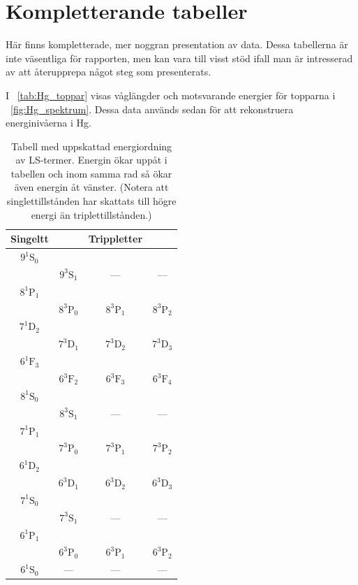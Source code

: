 \documentclass[11pt,a4paper]{article}
\newcommand{\figref}{\figurename~\ref}
\newcommand{\tabref}{\tablename~\ref} %
\begin{document}
\section{Kompletterande tabeller}\label{sec:kompl}
Här finns kompletterade, mer noggran presentation av data. Dessa tabellerna är inte väsentliga för rapporten, men kan vara till visst stöd ifall man är intresserad av att återupprepa något steg som presenterats.

I \tabref{tab:Hg_toppar} visas våglängder och motsvarande energier för topparna i \figref{fig:Hg_spektrum}. Dessa data används sedan för att rekonstruera energinivåerna i Hg.

\begin{table}
\centering
\caption{Tabell med uppskattad energiordning av LS-termer. Energin ökar uppåt i tabellen och inom samma rad så ökar även energin åt vänster. (Notera att singlettillstånden har skattats till högre energi än triplettillstånden.)} 
\label{tab:sorterade_termer}
\begin{tabular}{|c|ccc|}\hline
Singeltt & & Trippletter &\\\hline\hline
 $9^1\mathrm{S}_0$ & & &\\
&$9^3\mathrm{S}_1$ & --- &--- 
\\ \hline
 $8^1\mathrm{P}_1$ & & &\\
&$8^3\mathrm{P}_0$ & $8^3\mathrm{P}_1$ & $8^3\mathrm{P}_2$ 
\\ \hline
 $7^1\mathrm{D}_2$ & & &\\
&$7^3\mathrm{D}_1$ & $7^3\mathrm{D}_2$ & $7^3\mathrm{D}_3$ 
\\ \hline
 $6^1\mathrm{F}_3$ & & &\\
&$6^3\mathrm{F}_2$ & $6^3\mathrm{F}_3$ & $6^3\mathrm{F}_4$ 
\\ \hline
 $8^1\mathrm{S}_0$ & & &\\
&$8^3\mathrm{S}_1$ & --- &--- 
\\ \hline
 $7^1\mathrm{P}_1$ & & &\\
&$7^3\mathrm{P}_0$ & $7^3\mathrm{P}_1$ & $7^3\mathrm{P}_2$ 
\\ \hline
 $6^1\mathrm{D}_2$ & & &\\
&$6^3\mathrm{D}_1$ & $6^3\mathrm{D}_2$ & $6^3\mathrm{D}_3$ 
\\ \hline
 $7^1\mathrm{S}_0$ & & & \\
&$7^3\mathrm{S}_1$ &--- &--- 
\\ \hline
 $6^1\mathrm{P}_1$ & & &\\
&$6^3\mathrm{P}_0$ & $6^3\mathrm{P}_1$ & $6^3\mathrm{P}_2$ 
\\ \hline
$6^1\mathrm{S}_0$ & --- & --- & ---
\\ \hline
\end{tabular}
\end{table}
\end{document}
